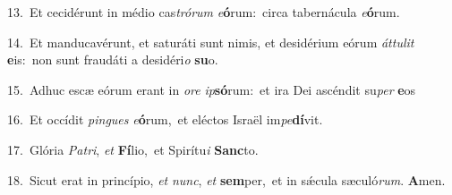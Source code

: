 {\numbfont\textcolor{\numbcolor}{13.}}~Et cecidérunt in médio cas\-\textit{tró}\-\textit{rum} \textit{e}\-\textbf{ó}rum:~\star circa tabernácula \textit{e}\-\textbf{ó}rum.\par
{\numbfont\textcolor{\numbcolor}{14.}}~Et manducavérunt, et saturáti sunt nimis, et desidérium eórum \textit{át}\-\textit{tu}\textit{lit} \textbf{e}\-is:~\star non sunt fraudáti a desidéri\textit{o} \textbf{su}\-o.\par
{\numbfont\textcolor{\numbcolor}{15.}}~Adhuc escæ eórum erant in \textit{o}\-\textit{re} \textit{ip}\-\textbf{só}rum:~\star et ira Dei ascéndit su\textit{per} \textbf{e}\-os\par
{\numbfont\textcolor{\numbcolor}{16.}}~Et occídit \textit{pin}\-\textit{gues} \textit{e}\-\textbf{ó}rum,~\star et eléctos Israël im\-\textit{pe}\-\textbf{dí}vit.\par
{\numbfont\textcolor{\numbcolor}{17.}}~Glória \textit{Pa}\-\textit{tri}, \textit{et} \textbf{Fí}\-lio,~\star et Spirítu\textit{i} \textbf{Sanc}\-to.\par
{\numbfont\textcolor{\numbcolor}{18.}}~Sicut erat in princípio, \textit{et} \textit{nunc}\-, \textit{et} \textbf{sem}\-per,~\star et in sǽcula sæculó\-\textit{rum}\-. \textbf{A}\-men.\par
